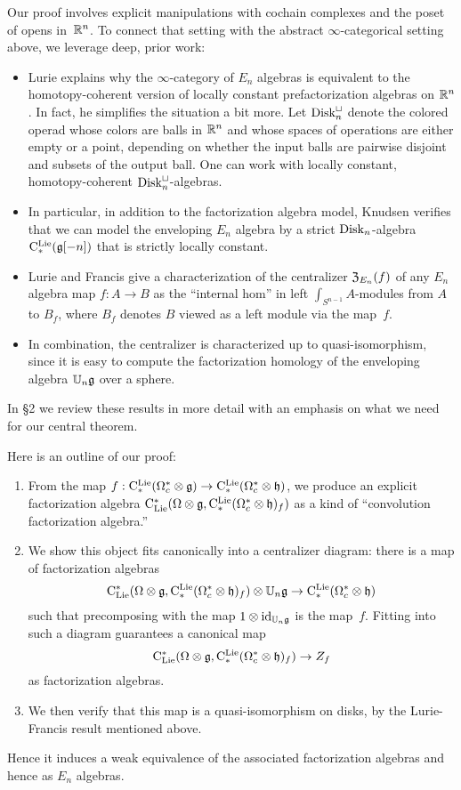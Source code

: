 \documentclass[11pt]{amsart}
\numberwithin{equation}{section}
\begin{document}
Our proof involves explicit manipulations with cochain complexes and the poset of opens in~$\mathbb R^n$.
To connect that setting with the abstract $\infty$-categorical setting above,
we leverage deep, prior work:
\begin{itemize}
\item Lurie \cite{LurieHA} explains why the $\infty$-category of $E_n$ algebras is equivalent to the homotopy-coherent version of locally constant prefactorization algebras on $\mathbb R^n$.  
In fact, he simplifies the situation a bit more. 
Let ${\rm Disk}_n^\sqcup$ denote the colored operad whose colors are balls in $\mathbb R^n$ and whose spaces of operations are either empty or a point, depending on whether the input balls are pairwise disjoint and subsets of the output ball. 
One can work with locally constant, homotopy-coherent ${\rm Disk}_n^\sqcup$-algebras.
\item In particular, in addition to the factorization algebra model, Knudsen verifies that we can model the enveloping $E_n$ algebra by a strict ${\rm Disk}_n$-algebra ${\rm C}^{\rm Lie}_*(\mathfrak g[-n])$ that is strictly locally constant.
\item Lurie and Francis give a characterization of the centralizer ${\frak Z}_{E_n}(f)$ of any $E_n$ algebra map $f: A \to B$ as the ``internal hom'' in left $\int_{S^{n-1}}A$-modules from $A$ to $B_f$, where $B_f$ denotes $B$ viewed as a left module via the map~$f$.
\item In combination, the centralizer is characterized up to quasi-isomorphism, 
since it is easy to compute the factorization homology of the enveloping algebra $\mathbb U_n \mathfrak g$ over a sphere.
\end{itemize}
In \S2 we review these results in more detail with an emphasis on what we need for our central theorem.

Here is an outline of our proof:
\begin{enumerate}
\item From the map $f: {\rm C}^{\rm Lie}_*(\Omega_c^* \otimes \mathfrak g) \to {\rm C}^{\rm Lie}_*(\Omega_c^* \otimes \mathfrak h)$, 
we produce an explicit factorization algebra ${\rm C}_{\rm Lie}^*(\Omega \otimes \mathfrak g, {\rm C}^{\rm Lie}_*(\Omega_c^* \otimes \mathfrak h)_f)$ as a kind of ``convolution factorization algebra.'' 
\item We show this object fits canonically into a centralizer diagram: there is a map of factorization algebras
\[
{\rm C}_{\rm Lie}^*(\Omega \otimes \mathfrak g, {\rm C}^{\rm Lie}_*(\Omega_c^* \otimes \mathfrak h)_f) \otimes \mathbb U_n \mathfrak g \to {\rm C}^{\rm Lie}_*(\Omega_c^* \otimes \mathfrak h)
\]
such that precomposing with the map $1 \otimes {\rm id}_{\mathbb U_n \mathfrak g}$ is the map~$f$.
Fitting into such a diagram guarantees a canonical map 
\[
{\rm C}_{\rm Lie}^*(\Omega \otimes \mathfrak g, {\rm C}^{\rm Lie}_*(\Omega_c^* \otimes \mathfrak h)_f) \to Z_f
\]
as factorization algebras. 
\item We then verify that this map is a quasi-isomorphism on disks, by the Lurie-Francis result mentioned above. 
\end{enumerate}
Hence it induces a weak equivalence of the associated factorization algebras and hence as $E_n$ algebras. 
\end{document}
